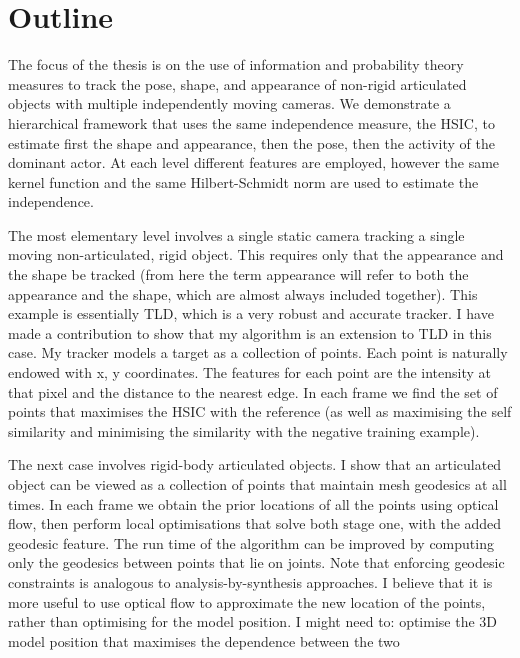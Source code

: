 \chapter{Outline}
\label{outline}

\citet{campbell16}

The focus of the thesis is on the use of information and probability theory measures to track the pose, shape, and appearance of non-rigid articulated objects with multiple independently moving cameras. We demonstrate a hierarchical framework that uses the same independence measure, the HSIC, to estimate first the shape and appearance, then the pose, then the activity of the dominant actor. At each level different features are employed, however the same kernel function and the same Hilbert-Schmidt norm are used to estimate the independence. 

The most elementary level involves a single static camera tracking a single moving non-articulated, rigid object. This requires only that the appearance and the shape be tracked (from here the term appearance will refer to both the appearance and the shape, which are almost always included together). This example is essentially TLD, which is a very robust and accurate tracker. I have made a contribution to show that my algorithm is an extension to TLD in this case. My tracker models a target as a collection of points. Each point is naturally endowed with x, y coordinates. The features for each point are the intensity at that pixel and the distance to the nearest edge. In each frame we find the set of points that maximises the HSIC with the reference (as well as maximising the self similarity and minimising the similarity with the negative training example).

The next case involves rigid-body articulated objects. I show that an articulated object can be viewed as a collection of points that maintain mesh geodesics at all times. In each frame we obtain the prior locations of all the points using optical flow, then perform local optimisations that solve both stage one, with the added geodesic feature. The run time of the algorithm can be improved by computing only the geodesics between points that lie on joints. Note that enforcing geodesic constraints is analogous to analysis-by-synthesis approaches. I believe that it is more useful to use optical flow to approximate the new location of the points, rather than optimising for the model position. I might need to: optimise the 3D model position that maximises the dependence between the two 

